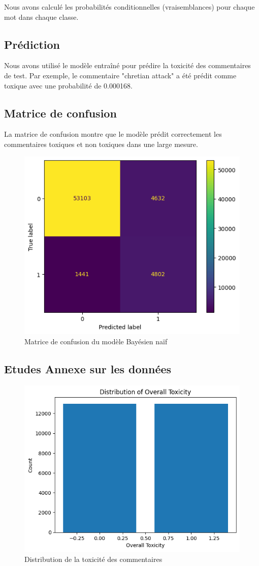 Nous avons calculé les probabilités conditionnelles (vraisemblances) pour chaque mot dans chaque classe.

\subsection{Prédiction}

Nous avons utilisé le modèle entraîné pour prédire la toxicité des commentaires de test. Par exemple, le commentaire "chretian attack" a été prédit comme toxique avec une probabilité de 0.000168.

\subsection{Matrice de confusion}

La matrice de confusion montre que le modèle prédit correctement les commentaires toxiques et non toxiques dans une large mesure.

\begin{figure}[h]
    \centering
    \includegraphics[width=.49\linewidth]{figures/matrix-confusion-naive_bayes.png}
    \caption{Matrice de confusion du modèle Bayésien naïf}
\end{figure}

\subsection{Etudes Annexe sur les données}
\begin{figure}[h]
        \centering
        \includegraphics[width=.43\linewidth]{figures/distribution-toxicity-naive_bayes.png}
        \caption{Distribution de la toxicité des commentaires}
    \end{figure}

